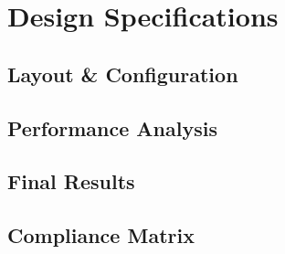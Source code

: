 \chapter{Design Specifications}
\setlength{\parindent}{15pt}
\label{ch:desi_spec}

\section{Layout \& Configuration}
\label{sec:layo_conf}

\section{Performance Analysis}
\label{sec:perf_anal}

\section{Final Results}
\label{sec:fina_resu}

\section{Compliance Matrix}
\label{sec:comp_matr}
